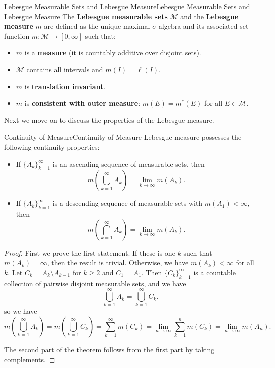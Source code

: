 \documentclass[../main.tex]{subfiles}
\begin{document}
\begin{definition}{Lebesgue Measurable Sets and Lebesgue Measure}{Lebesgue Measurable Sets and Lebesgue Measure}
  The \textbf{Lebesgue measurable sets} $\mathcal{M}$ and the \textbf{Lebesgue measure} $m$ are defined as the unique maximal $\sigma$-algebra and its associated set function $m: \mathcal{M} \to [0, \infty]$ such that:
  \begin{itemize}
    \item $m$ is a \textbf{measure} (it is countably additive over disjoint sets).
    \item $\mathcal{M}$ contains all intervals and $m(I) = \ell(I)$.
    \item $m$ is \textbf{translation invariant}.
    \item $m$ is \textbf{consistent with outer measure}: $m(E) = m^*(E)$ for all $E \in \mathcal{M}$.
  \end{itemize}
\end{definition}

Next we move on to discuss the properties of the Lebesgue measure.

\begin{theorem}{Continuity of Measure}{Continuity of Measure}
  Lebesgue measure possesses the following continuity properties:
  \begin{itemize}
    \item If $\{A_k\}_{k=1}^{\infty}$ is an ascending sequence of measurable sets, then
      \begin{equation}
        m\left(\bigcup_{k=1}^{\infty} A_k\right) = \lim_{k \to \infty} m(A_k).
      \end{equation}
    \item If $\{A_k\}_{k=1}^{\infty}$ is a descending sequence of measurable sets with $m(A_1) < \infty$, then
      \begin{equation}
        m\left(\bigcap_{k=1}^{\infty} A_k\right) = \lim_{k \to \infty} m(A_k).
      \end{equation}
  \end{itemize}
\end{theorem}
\begin{proof}
  First we prove the first statement. If these is one $k$ such that $m(A_k) = \infty$, then the result is trivial. Otherwise, we have $m(A_k) < \infty$ for all $k$. Let $C_k = A_k \setminus A_{k-1}$ for $k \geq 2$ and $C_1 = A_1$. Then $\{C_k\}_{k=1}^{\infty}$ is a countable collection of pairwise disjoint measurable sets, and we have
  \begin{equation*}
    \bigcup_{k=1}^{\infty} A_k = \bigcup_{k=1}^{\infty} C_k.
  \end{equation*}
  so we have
  \begin{equation*}
    m\left(\bigcup_{k=1}^{\infty} A_k\right) = m\left(\bigcup_{k=1}^{\infty} C_k\right) = \sum_{k=1}^{\infty} m(C_k) = \lim_{n \to \infty} \sum_{k=1}^{n} m(C_k) = \lim_{n \to \infty} m(A_n).
  \end{equation*}

  The second part of the theorem follows from the first part by taking complements.
\end{proof}
\end{document}
